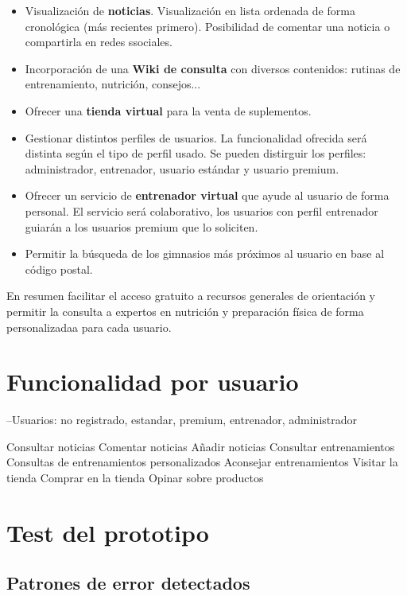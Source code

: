 \documentclass[a4paper]{article}
\begin{document}
\begin{itemize}
	\item	Visualización de \textbf{noticias}. Visualización en lista ordenada de forma cronológica (más recientes primero). Posibilidad de comentar una noticia o compartirla en redes ssociales.
	
	\item	Incorporación de una \textbf{Wiki de consulta} con diversos contenidos: rutinas de entrenamiento, nutrición, consejos...
	
	\item	Ofrecer una \textbf{tienda virtual} para la venta de suplementos.
	
	\item	Gestionar distintos perfiles de usuarios. La funcionalidad ofrecida será distinta según el tipo de perfil usado. Se pueden distirguir los perfiles: administrador, entrenador, usuario estándar y usuario premium.
	
	\item	Ofrecer un servicio de \textbf{entrenador virtual} que ayude al usuario de forma personal. El servicio será colaborativo, los usuarios con perfil entrenador guiarán a los usuarios premium que lo soliciten.
	
	\item	Permitir la búsqueda de los gimnasios más próximos al usuario en base al código postal.
\end{itemize}

En resumen facilitar el acceso gratuito a recursos generales de orientación y permitir la consulta a expertos en nutrición y preparación física de forma personalizadaa para cada usuario.

\section{Funcionalidad por usuario}


--Usuarios: no registrado, estandar, premium, entrenador, administrador

Consultar noticias
Comentar noticias
Añadir noticias
Consultar entrenamientos
Consultas de entrenamientos personalizados
Aconsejar entrenamientos
Visitar la tienda
Comprar en la tienda
Opinar sobre productos



\section{Test del prototipo}

\subsection{Patrones de error detectados}
\end{document}
